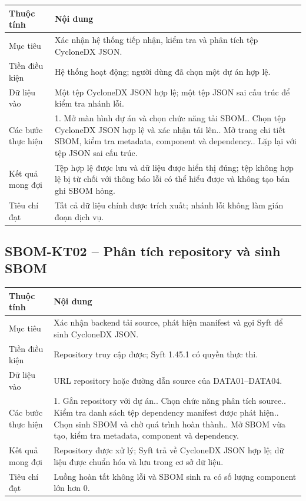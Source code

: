 \documentclass[12pt,a4paper]{article}
\begin{document}
\begin{longtable}{|L{3.4cm}|L{11.2cm}|}
  \hline
  \textbf{Thuộc tính} & \textbf{Nội dung} \\ \hline
  Mục tiêu & Xác nhận hệ thống tiếp nhận, kiểm tra và phân tích tệp CycloneDX JSON. \\ \hline
  Tiền điều kiện & Hệ thống hoạt động; người dùng đã chọn một dự án hợp lệ. \\ \hline
  Dữ liệu vào & Một tệp CycloneDX JSON hợp lệ; một tệp JSON sai cấu trúc để kiểm tra nhánh lỗi. \\ \hline
  Các bước thực hiện &
  1. Mở màn hình dự án và chọn chức năng tải SBOM.. Chọn tệp CycloneDX JSON hợp lệ và xác nhận tải lên.. Mở trang chi tiết SBOM, kiểm tra metadata, component và dependency.. Lặp lại với tệp JSON sai cấu trúc. \\ \hline
  Kết quả mong đợi &
  Tệp hợp lệ được lưu và dữ liệu được hiển thị đúng; tệp không hợp lệ bị từ chối với
  thông báo lỗi có thể hiểu được và không tạo bản ghi SBOM hỏng. \\ \hline
  Tiêu chí đạt & Tất cả dữ liệu chính được trích xuất; nhánh lỗi không làm gián đoạn dịch vụ. \\ \hline
\end{longtable}

\subsection{SBOM-KT02 -- Phân tích repository và sinh SBOM}

\begin{longtable}{|L{3.4cm}|L{11.2cm}|}
  \hline
  \textbf{Thuộc tính} & \textbf{Nội dung} \\ \hline
  Mục tiêu & Xác nhận backend tải source, phát hiện manifest và gọi Syft để sinh CycloneDX JSON. \\ \hline
  Tiền điều kiện & Repository truy cập được; Syft 1.45.1 có quyền thực thi. \\ \hline
  Dữ liệu vào & URL repository hoặc đường dẫn source của DATA01--DATA04. \\ \hline
  Các bước thực hiện &
  1. Gắn repository với dự án.. Chọn chức năng phân tích source.. Kiểm tra danh sách tệp dependency manifest được phát hiện.. Chọn sinh SBOM và chờ quá trình hoàn thành.. Mở SBOM vừa tạo, kiểm tra metadata, component và dependency. \\ \hline
  Kết quả mong đợi & Repository được xử lý; Syft trả về CycloneDX JSON hợp lệ; dữ liệu
  được chuẩn hóa và lưu trong cơ sở dữ liệu. \\ \hline
  Tiêu chí đạt & Luồng hoàn tất không lỗi và SBOM sinh ra có số lượng component lớn hơn 0. \\ \hline
\end{longtable}
\end{document}
